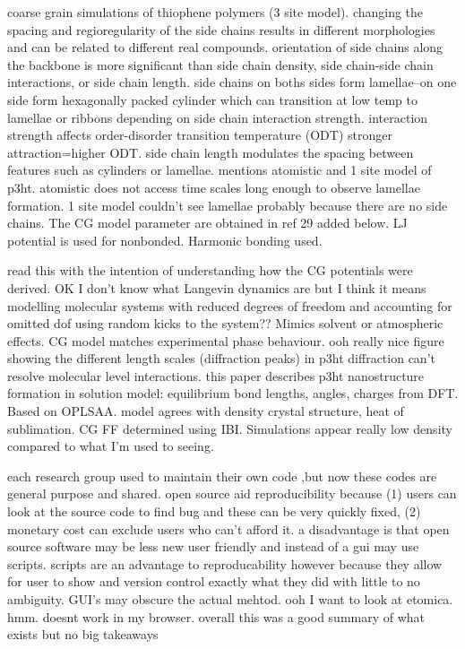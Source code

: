 \documentclass{article}
\begin{document}
\cite{Marsh2014}
coarse grain simulations of thiophene polymers (3 site model). changing the spacing and regioregularity of the side chains results in different morphologies and can be related to different real compounds.
orientation of side chains along the backbone is more significant than side chain density, side chain-side chain interactions, or side chain length. side chains on boths sides form lamellae--on one side form hexagonally packed cylinder which can transition at low temp to lamellae or ribbons depending on side chain interaction strength. interaction strength affects order-disorder transition temperature (ODT) stronger attraction=higher ODT. side chain length modulates the spacing between features such as cylinders or lamellae.
mentions atomistic and 1 site model of p3ht. atomistic does not access time scales long enough to observe lamellae formation. 1 site model couldn't see lamellae probably because there are no side chains.
The CG model parameter are obtained in ref 29 added below. LJ potential is used for nonbonded. Harmonic bonding used.

\cite{Schwarz2013}
read this with the intention of understanding how the CG potentials were derived.
OK I don't know what Langevin dynamics are but I think it means modelling molecular systems with reduced degrees of freedom and accounting for omitted dof using random kicks to the system?? Mimics solvent or atmospheric effects.
CG model matches experimental phase behaviour. 
ooh really nice figure showing the different length scales (diffraction peaks) in p3ht
diffraction can't resolve molecular level interactions.
this paper describes p3ht nanostructure formation in solution
model: equilibrium bond lengths, angles, charges from DFT. Based on OPLSAA. model agrees with density crystal structure, heat of sublimation. CG FF determined using IBI.
Simulations appear really low density compared to what I'm used to seeing.

\cite{Cummings2019}

each research group used to maintain their own code ,but now these codes are general purpose and shared. open source aid reproducibility because (1) users can look at the source code to find bug and these can be very quickly fixed, (2) monetary cost can exclude users who can't afford it.
a disadvantage is that open source software may be less new user friendly and instead of a gui may use scripts. scripts are an advantage to reproducability however because they allow for user to show and version control exactly what they did with little to no ambiguity. GUI's may obscure the actual mehtod.
ooh I want to look at etomica. hmm. doesnt work in my browser.
overall this was a good summary of what exists but no big takeaways
\end{document}
